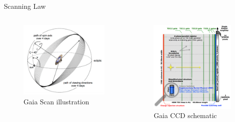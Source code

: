 \documentclass[hyperref={colorlinks = true, linkcolor=blue},8pt]{beamer}
\begin{document}
\begin{frame}{Scanning Law }
\begin{columns}
\begin{column}{0.5\columnwidth}
		\begin{figure}
			\includegraphics[width=\columnwidth]{scanninglaw.png}
			\caption{Gaia Scan illustration\cite{collaborationGaia2016}}
		\end{figure}
\end{column}
\begin{column}{0.5\columnwidth}
		\begin{figure}
			\includegraphics[width=\columnwidth]{gaiaccd.png}
			\caption{Gaia CCD schematic\cite{collaborationGaia2016}}
		\end{figure}
\end{column}
\end{columns}

\end{frame}
\end{document}
